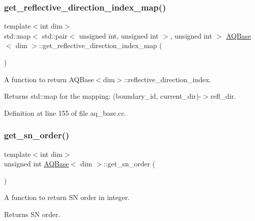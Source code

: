 \mbox{\label{class_a_q_base_a1cb901657861f7fc580fc29e10c0b691}} 
\subsubsection{\texorpdfstring{get\+\_\+reflective\+\_\+direction\+\_\+index\+\_\+map()}{get\_reflective\_direction\_index\_map()}}
{\footnotesize\ttfamily template$<$int dim$>$ \\
std\+::map$<$ std\+::pair$<$ unsigned int, unsigned int $>$, unsigned int $>$ \hyperlink{class_a_q_base}{A\+Q\+Base}$<$ dim $>$\+::get\+\_\+reflective\+\_\+direction\+\_\+index\+\_\+map (\begin{DoxyParamCaption}{ }\end{DoxyParamCaption})}

A function to return A\+Q\+Base$<$dim$>$\+::reflective\+\_\+direction\+\_\+index.

\begin{DoxyReturn}{Returns}
std\+::map for the mapping\+: (boundary\+\_\+id, current\+\_\+dir)-\/$>$refl\+\_\+dir. 
\end{DoxyReturn}


Definition at line 155 of file aq\+\_\+base.\+cc.

\mbox{\label{class_a_q_base_a9ce78884d13c584a8f415c16976ea6f0}} 
\subsubsection{\texorpdfstring{get\+\_\+sn\+\_\+order()}{get\_sn\_order()}}
{\footnotesize\ttfamily template$<$int dim$>$ \\
unsigned int \hyperlink{class_a_q_base}{A\+Q\+Base}$<$ dim $>$\+::get\+\_\+sn\+\_\+order (\begin{DoxyParamCaption}{ }\end{DoxyParamCaption})}

A function to return SN order in integer.

\begin{DoxyReturn}{Returns}
SN order. 
\end{DoxyReturn}


